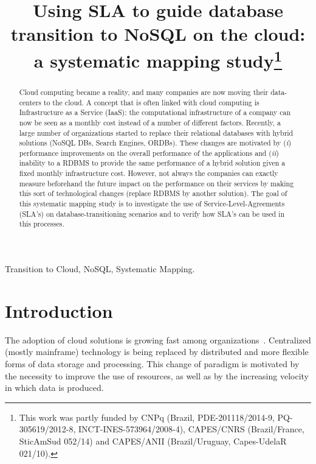 \documentclass[conference, 10pt, a4paper]{IEEEtran}
\begin{document}
\title{Using SLA to guide database transition to NoSQL on the cloud: a systematic mapping study\thanks{This work was partly funded by CNPq (Brazil, PDE-201118/2014-9, PQ-305619/2012-8, INCT-INES-573964/2008-4), CAPES/CNRS (Brazil/France, SticAmSud 052/14) and CAPES/ANII (Brazil/Uruguay, Capes-UdelaR 021/10).}}

\author{
}

\maketitle  


\begin{abstract}
Cloud computing became a reality, and many companies are now moving their data-centers to the cloud. 
A concept that is often linked with cloud computing is Infrastructure as a Service (IaaS): the computational infrastructure of a company can now be seen as a monthly cost instead of a number of different factors. 
Recently, a large number of organizations started to replace their relational databases with hybrid solutions (NoSQL DBs, Search Engines, ORDBs). 
These changes are motivated by (\textit{i}) performance improvements on the overall performance of the applications and (\textit{ii}) inability to a RDBMS to provide the same performance of a hybrid solution given a fixed monthly infrastructure cost. 
However, not always the companies can exactly measure beforehand the future impact on the performance on their services by making this sort of technological changes (replace RDBMS by another solution). 
The goal of this systematic mapping study is to investigate the use of Service-Level-Agreements (SLA’s) on database-transitioning scenarios and to verify how SLA’s can be used in this processes.
\end{abstract}

\begin{IEEEkeywords}
Transition to Cloud, NoSQL, Systematic Mapping.
\end{IEEEkeywords}

\section{Introduction}

The adoption of cloud solutions is growing fast among organizations~\cite{6546068}.
Centralized (mostly mainframe) technology is being replaced by distributed and more flexible forms of data storage and processing.
This change of paradigm is motivated by the necessity to improve the use of resources, as well as by the increasing velocity in which data is produced.
\end{document}
